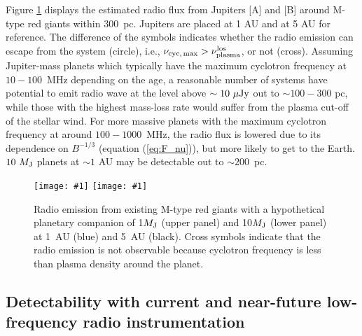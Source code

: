\documentclass[iop,numberedappendix,apj]{emulateapj}
\def\plotoneh#1{\centering \leavevmode
\texttt{[image: \#1]}}
\begin{document}
Figure \ref{fig:observability} displays the estimated radio flux from Jupiters [A] and [B] around M-type red giants within 300~pc. 
Jupiters are placed at 1 AU and at 5 AU for reference. 
The difference of the symbols indicates whether the radio emission can escape from the system (circle), i.e., $\nu _{\rm cyc,\,max} > \nu_{\rm plasma}^{\rm los}$,  or not (cross). 
Assuming Jupiter-mass planets which typically have the maximum cyclotron frequency at $10-100$~MHz depending on the age, a reasonable number of systems have potential to emit radio wave at the level above $\sim 10~\mu {\rm Jy}$  out to $\sim 100-300$ pc, while those with the highest mass-loss rate would suffer from the plasma cut-off of the stellar wind. 
For more massive planets with the maximum cyclotron frequency at around $100-1000$~MHz, the radio flux is lowered due to its dependence on $B^{-1/3}$ (equation (\ref{eq:F_nu})), but more likely to get to the Earth. $10~M_{\rm J}$ planets at $\sim 1$ AU may be detectable out to $\sim 200$~pc.


\begin{figure}[tbhp]
   \plotoneh{radio_M-RG_1Mp.pdf}
   \plotoneh{radio_M-RG_10Mp.pdf}
   \caption{Radio emission from existing M-type red giants with a hypothetical planetary companion of 1$M_{\rm J}$ (upper panel) and 10$M_{\rm J}$ (lower panel) at 1~AU (blue) and 5~AU (black).
Cross symbols indicate that the radio emission is not observable because cyclotron frequency is less than plasma density around the planet. }
  \label{fig:observability}
\end{figure}


\subsection{Detectability with current and near-future low-frequency radio instrumentation}
\label{ss:detectability}
\end{document}
